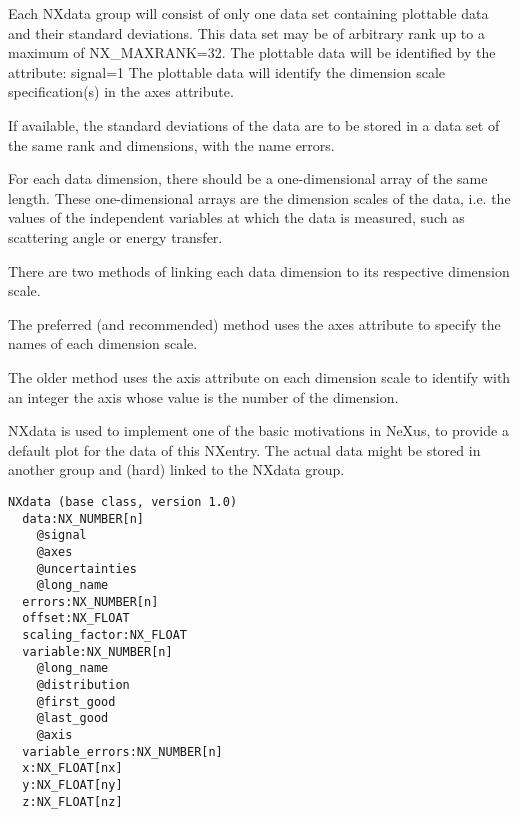 \documentclass[11pt]{article}
\begin{document}
{{    Each NXdata group will consist of only one data set containing plottable data and their standard deviations.
    This data set may be of arbitrary rank up to a maximum of NX\_MAXRANK=32.
    The plottable data will be identified by the attribute: signal=1
    The plottable data will identify the dimension scale specification(s) in the axes attribute.

If available, the standard deviations of the data are to be stored in a data set of the same rank and dimensions, with the name errors.

    For each data dimension, there should be a one-dimensional array of the same length.
    These one-dimensional arrays are the dimension scales of the data, i.e. the values of the independent variables at which the data is measured, such as scattering angle or energy transfer.

There are two methods of linking each data dimension to its respective dimension scale.

The preferred (and recommended) method uses the axes attribute to specify the names of each dimension scale.

The older method uses the axis attribute on each dimension scale to identify with an integer the axis whose value is the number of the dimension.

NXdata is used to implement one of the basic motivations in NeXus, to provide a default plot for the data of this NXentry. The actual data might be stored in another group and (hard) linked to the NXdata group.

\begin{verbatim}
NXdata (base class, version 1.0)
  data:NX_NUMBER[n]
    @signal
    @axes
    @uncertainties
    @long_name
  errors:NX_NUMBER[n]
  offset:NX_FLOAT
  scaling_factor:NX_FLOAT
  variable:NX_NUMBER[n]
    @long_name
    @distribution
    @first_good
    @last_good
    @axis
  variable_errors:NX_NUMBER[n]
  x:NX_FLOAT[nx]
  y:NX_FLOAT[ny]
  z:NX_FLOAT[nz]
\end{verbatim}

\begin{itemize}


\end{itemize}}}
\end{document}
